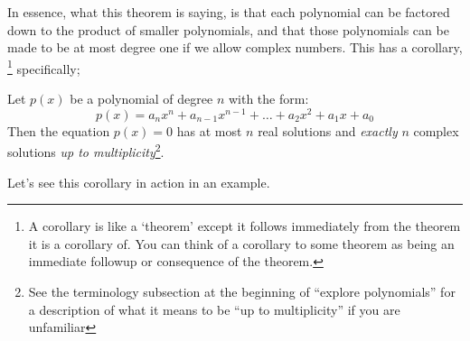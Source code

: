 \documentclass{ximera}
\begin{document}
    In essence, what this theorem is saying, is that each polynomial can be factored down to the product of smaller polynomials, and that those polynomials can be made to be at most degree one if we allow complex numbers. This has a corollary,%
    \footnote{A corollary is like a `theorem' except it follows immediately from the theorem it is a corollary of. You can think of a corollary to some theorem as being an immediate followup or consequence of the theorem.}
    specifically;
    
    \begin{corollary}
        Let $p(x)$ be a polynomial of degree $n$ with the form:
        \[
            p(x) = a_nx^n + a_{n-1}x^{n-1} + \dots + a_2x^2 + a_1x + a_0
        \]
        Then the equation $p(x) = 0$ has at most $n$ real solutions and \textit{exactly} $n$ complex solutions \textit{up to multiplicity}\footnote{See the terminology subsection at the beginning of ``explore polynomials'' for a description of what it means to be ``up to multiplicity'' if you are unfamiliar}.
    \end{corollary}
    
    Let's see this corollary in action in an example.
    
\end{document}
